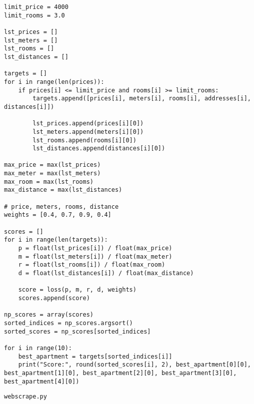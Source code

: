 \documentclass[12pt]{article}
\begin{document}
\begin{lstlisting}
limit_price = 4000
limit_rooms = 3.0

lst_prices = []
lst_meters = []
lst_rooms = []
lst_distances = []

targets = []
for i in range(len(prices)):
    if prices[i] <= limit_price and rooms[i] >= limit_rooms:
        targets.append([prices[i], meters[i], rooms[i], addresses[i], distances[i]])

        lst_prices.append(prices[i][0])
        lst_meters.append(meters[i][0])
        lst_rooms.append(rooms[i][0])
        lst_distances.append(distances[i][0])

max_price = max(lst_prices)
max_meter = max(lst_meters)
max_room = max(lst_rooms)
max_distance = max(lst_distances)

# price, meters, rooms, distance
weights = [0.4, 0.7, 0.9, 0.4]

scores = []
for i in range(len(targets)):
    p = float(lst_prices[i]) / float(max_price)
    m = float(lst_meters[i]) / float(max_meter)
    r = float(lst_rooms[i]) / float(max_room)
    d = float(lst_distances[i]) / float(max_distance)

    score = loss(p, m, r, d, weights)
    scores.append(score)

np_scores = array(scores)
sorted_indices = np_scores.argsort()
sorted_scores = np_scores[sorted_indices]

for i in range(10):
    best_apartment = targets[sorted_indices[i]]
    print("Score:", round(sorted_scores[i], 2), best_apartment[0][0], best_apartment[1][0], best_apartment[2][0], best_apartment[3][0], best_apartment[4][0])

\end{lstlisting}

\newpage
\begin{verbatim}
webscrape.py
\end{verbatim}
\end{document}
